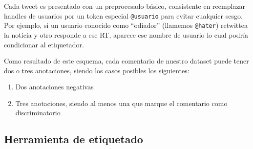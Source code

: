 Cada tweet es presentado con un preprocesado básico, consistente en reemplazar handles de usuarios por un token especial \verb|@usuario| para evitar cualquier sesgo. Por ejemplo, si un usuario conocido como ``odiador'' (llamemos \verb|@hater|) retwittea la noticia y otro responde a ese RT, aparece ese nombre de usuario lo cual podría condicionar al etiquetador.




Como resultado de este esquema, cada comentario de nuestro dataset puede tener dos o tres anotaciones, siendo los casos posibles los siguientes:

\begin{enumerate}
    \item Dos anotaciones negativas
    \item Tres anotaciones, siendo al menos una que marque el comentario como discriminatorio
\end{enumerate}


%
%
\subsection{Herramienta de etiquetado}


